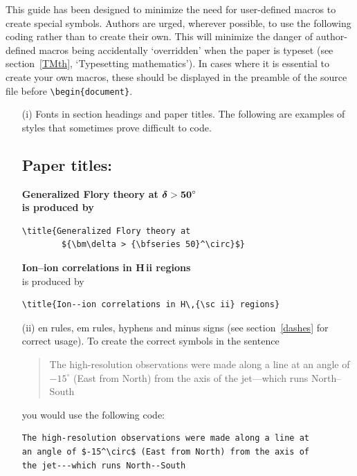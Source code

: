 \documentclass{rQUF2e}
\theoremstyle{plain}
\theoremstyle{definition}
\theoremstyle{remark}
\begin{document}
This guide has been designed to minimize the need for user-defined macros to
create special symbols. Authors are urged, wherever possible, to use the
following coding rather than to create their own. This will minimize the danger
of author-defined macros being accidentally `overridden' when the paper is
typeset (see section~\ref{TMth}, `Typesetting mathematics'). In cases
where it is essential to create your own macros, these should be displayed in
the preamble of the source file before \verb"\begin{document}".
%
\begin{enumerate}
\item[(i)] Fonts in section headings and paper titles. The following are  examples
of styles that sometimes prove difficult to code.

\subsection*{Paper titles:}

\bf{\noindent Generalized Flory theory at ${\bm\delta >
{\bf
   50}^\circ}$}\\

    \noindent\normalfont is produced by
\begin{verbatim}
\title{Generalized Flory theory at
        ${\bm\delta > {\bfseries 50}^\circ}$}
\end{verbatim}
\bigskip

{\bf{\noindent Ion--ion correlations in H\,{\sc ii} regions}}\\

\noindent\normalfont is produced by
\begin{verbatim}
\title{Ion--ion correlations in H\,{\sc ii} regions}
\end{verbatim}

\item[(ii)] en rules, em rules, hyphens and minus signs (see section~\ref{dashes} for
correct usage). To create the correct symbols in the sentence
\begin{quote}
The high-resolution observations were made along a line at an
angle of $-15^\circ$ (East from North) from the axis of the
jet---which runs North--South
\end{quote}
you would use the following code:
\begin{verbatim}
The high-resolution observations were made along a line at
an angle of $-15^\circ$ (East from North) from the axis of
the jet---which runs North--South
\end{verbatim}


\end{enumerate}
\end{document}
